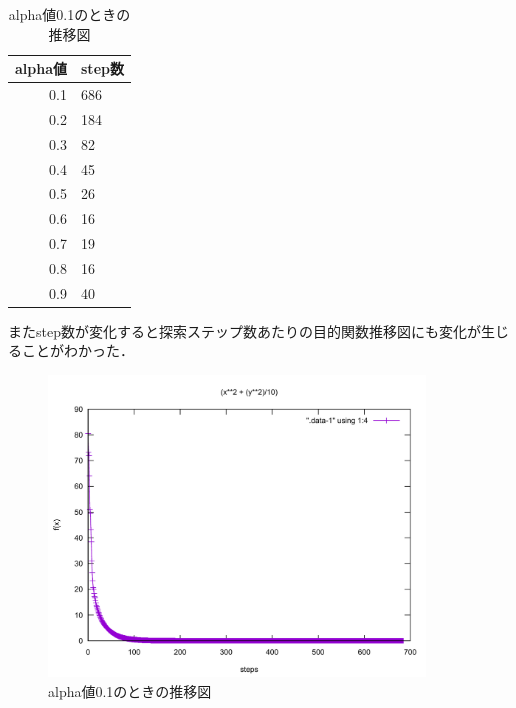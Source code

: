 \begin{table}[htb]
 \begin{center}
  \caption{alpha値を変更したときのstep数の変化}
  \label{table:level3}
  \begin{tabular}[htb]{r|l} \hline
   alpha値 &  step数\\ \hline \hline
   0.1 &  686\\ \hline
   0.2 & 184 \\ \hline
   0.3 & 82 \\ \hline
   0.4 & 45 \\ \hline
   0.5 & 26 \\ \hline
   0.6 & 16 \\ \hline
   0.7 & 19 \\ \hline
   0.8 & 16 \\ \hline
   0.9 & 40 \\ \hline \hline

  \end{tabular}
 \end{center}


またstep数が変化すると探索ステップ数あたりの目的関数推移図にも変化が生じることがわかった．\\

\begin{figure}[h]
 \begin{center}
  \includegraphics[width=10.0cm]{figs/level2.2/sim-1-2.pdf}
  \caption{alpha値0.1のときの推移図}
	\label{step_alpha}
 \end{center}
\end{figure}


\end{table}
